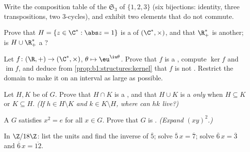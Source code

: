 \begin{exercise}[$\star$]\label{exo:b1:structures:3}
Write the composition table of the  $\mathfrak{S}_3$
of $\{1,2,3\}$ (six bijections: identity, three transpositions, two
$3$-cycles), and exhibit two elements that do not commute.
\end{exercise}

\begin{exercise}[$\star$]\label{exo:b1:structures:4}
Prove that $H = \{z \in \C^* : \abs z = 1\}$ is a  of $(\C^*,
\times)$, and that $\R_+^*$ is another; is $H \cup \R_+^*$ a
?
\end{exercise}

\begin{exercise}[$\star\star$]\label{exo:b1:structures:5}
Let $f \colon (\R, +) \to (\C^*, \times)$, $\theta \mapsto
\eu^{\iu\theta}$. Prove that $f$ is a , compute $\ker f$ and
$\operatorname{im} f$, and deduce from
\cref{prop:b1:structures:kernel} that $f$ is not . Restrict
the domain to make it  on an interval as large as possible.
\end{exercise}

\begin{exercise}[$\star\star$]\label{exo:b1:structures:6}
Let $H, K$ be  of $G$. Prove that $H \cap K$ is a ,
and that $H \cup K$ is a  \emph{only} when $H \subseteq K$ or
$K \subseteq H$. \emph{(If $h \in H \setminus K$ and $k \in K
\setminus H$, where can $hk$ live?)}
\end{exercise}

\begin{exercise}[$\star\star$]\label{exo:b1:structures:7}
A  $G$ satisfies $x^2 = e$ for all $x \in G$. Prove that $G$ is
. \emph{(Expand $(xy)^2$.)}
\end{exercise}

\begin{exercise}[$\star\star$]\label{exo:b1:structures:8}
In $\Z/18\Z$: list the units and find the inverse of $\overline 5$;
solve $\overline 5\, x = \overline 7$; solve $\overline 6\, x =
\overline 3$ and $\overline 6\, x = \overline{12}$.
\end{exercise}

